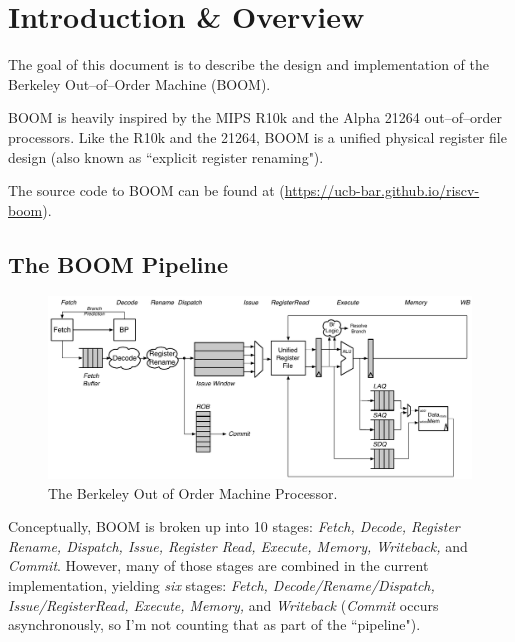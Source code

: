 
\chapter{Introduction \& Overview}
\label{sec:introduction}

The goal of this document is to describe the design and implementation of the Berkeley Out--of--Order Machine (BOOM). 


 BOOM is heavily inspired by the MIPS R10k and the Alpha 21264 out--of--order processors\cite{alpha21264, mipsr10k}.  Like the R10k and the 21264, BOOM is a unified physical register file design (also known as ``explicit register renaming"). 
 
 The source code to BOOM can be found at (\url{https://ucb-bar.github.io/riscv-boom}).

\section{The BOOM Pipeline}


\begin{figure}[ht]
	\centering
	\centerline{\includegraphics[scale =.9] {figures/boom_stages}}
	\caption{ \small The Berkeley Out of Order Machine Processor.}
	\label{fig:boom_stages}
\end{figure}



Conceptually, BOOM is broken up into 10 stages: {\em Fetch, Decode, Register Rename, Dispatch, Issue, Register Read, Execute, Memory, Writeback,} and {\em Commit}.  However, many of those stages are combined in the current implementation, yielding {\em six} stages: {\em Fetch, Decode/Rename/Dispatch, Issue/RegisterRead, Execute, Memory,} and {\em Writeback} ({\em Commit} occurs asynchronously, so I'm not counting that as part of the ``pipeline").   

